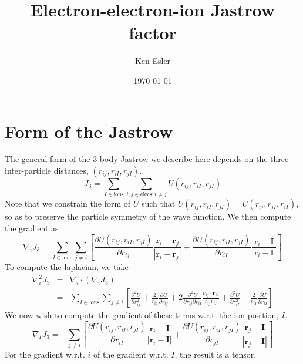 \documentclass[letterpaper]{article}
\author{Ken Esler}
\title{Electron-electron-ion Jastrow factor}
\date{\today}
\begin{document}
\maketitle
\newcommand{\riI}{r_{iI}}
\newcommand{\briI}{\mathbf{r}_{iI}}
\newcommand{\rjI}{r_{jI}}
\newcommand{\brjI}{\mathbf{r}_{jI}}
\newcommand{\rij}{r_{ij}}
\newcommand{\brij}{\mathbf{r}_{ij}}
\section{Form of the Jastrow}
The general form of the 3-body Jastrow we describe here depends on the
three inter-particle distances, $(\rij, \riI, \rjI)$.
\begin{equation}
J_3 = \sum_{I\in\text{ions}} \sum_{i,j \in\text{elecs};i\neq j} U(\rij, \riI,
\rjI)
\end{equation}
Note that we constrain the form of $U$ such that
$U(\rij, \riI,\rjI) = U(\rij, \rjI,\riI)$, so as to preserve the
particle symmetry of the wave function.  We then compute the gradient as
\begin{equation}
\nabla_i J_3 =  \sum_{I\in\text{ions}} \sum_{j \neq i}
\left[\frac{\partial U(\rij, \riI,\rjI)}{\partial\rij}
  \frac{\mathbf{r}_i - \mathbf{r}_j}{|\mathbf{r}_i - \mathbf{r}_j|} 
+ \frac{\partial U(\rij, \riI,\rjI)}{\partial\riI}
  \frac{\mathbf{r}_i - \mathbf{I}}{|\mathbf{r}_i - \mathbf{I}|}  \right]
\end{equation}
To compute the laplacian, we take
\begin{eqnarray}
\nabla_i^2 J_3 & = & \nabla_i \cdot \left(\nabla_i J_3\right) \\
& = & \sum_{I\in\text{ions}} \sum_{j\neq i } \left[
\frac{\partial^2 U}{\partial \rij^2} + \frac{2}{\rij} \frac{\partial
  U}{\partial \rij} + 2 \frac{\partial^2 U}{\partial \rij \partial
  \riI}\frac{\brij\cdot\briI}{\rij\riI} +\frac{\partial^2 U}{\partial
  \riI^2}
+ \frac{2}{\riI}\frac{\partial U}{\partial \riI} \nonumber
\right]
\end{eqnarray}
We now wish to compute the gradient of these terms w.r.t. the ion position, $I$.
\begin{equation}
\nabla_I J_3 = -\sum_{j\neq i} \left[ \frac{\partial U(\rij, \riI,\rjI)}{\partial\riI}
  \frac{\mathbf{r}_i - \mathbf{I}}{|\mathbf{r}_i - \mathbf{I}|} 
+\frac{\partial U(\rij, \riI,\rjI)}{\partial\rjI}
  \frac{\mathbf{r}_j - \mathbf{I}}{|\mathbf{r}_j - \mathbf{I}|} \right]
\end{equation}
For the gradient w.r.t. $i$ of the gradient w.r.t. $I$, the result is a tensor,
\end{document}
